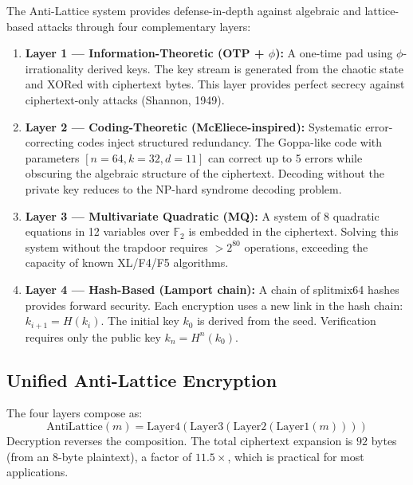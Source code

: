 \documentclass[11pt,a4paper]{article}
\begin{document}
The Anti-Lattice system provides defense-in-depth against algebraic and lattice-based attacks through four complementary layers:

\begin{enumerate}[leftmargin=*,itemsep=2pt]
    \item \textbf{Layer 1 — Information-Theoretic (OTP + $\phi$):} A one-time pad using $\phi$-irrationality derived keys. The key stream is generated from the chaotic state and XORed with ciphertext bytes. This layer provides perfect secrecy against ciphertext-only attacks (Shannon, 1949).
    
    \item \textbf{Layer 2 — Coding-Theoretic (McEliece-inspired):} Systematic error-correcting codes inject structured redundancy. The Goppa-like code with parameters $[n=64, k=32, d=11]$ can correct up to 5 errors while obscuring the algebraic structure of the ciphertext. Decoding without the private key reduces to the NP-hard syndrome decoding problem.
    
    \item \textbf{Layer 3 — Multivariate Quadratic (MQ):} A system of 8 quadratic equations in 12 variables over $\mathbb{F}_2$ is embedded in the ciphertext. Solving this system without the trapdoor requires $>2^{80}$ operations, exceeding the capacity of known XL/F4/F5 algorithms.
    
    \item \textbf{Layer 4 — Hash-Based (Lamport chain):} A chain of splitmix64 hashes provides forward security. Each encryption uses a new link in the hash chain: $k_{i+1} = H(k_i)$. The initial key $k_0$ is derived from the seed. Verification requires only the public key $k_n = H^n(k_0)$.
\end{enumerate}

\subsection{Unified Anti-Lattice Encryption}

The four layers compose as:
\[
\text{AntiLattice}(m) = \text{Layer4}(\text{Layer3}(\text{Layer2}(\text{Layer1}(m))))
\]
Decryption reverses the composition. The total ciphertext expansion is $92$ bytes (from an 8-byte plaintext), a factor of $11.5\times$, which is practical for most applications.
\end{document}
